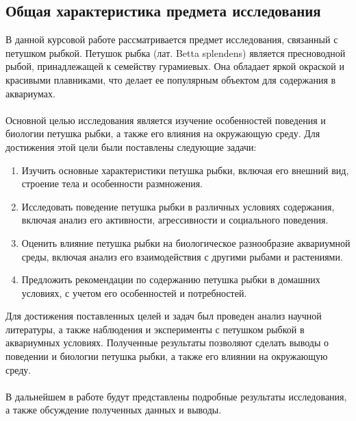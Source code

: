 \documentclass{article}
\begin{document}
\subsection{Общая характеристика предмета исследования}
В данной курсовой работе рассматривается предмет исследования, связанный с петушком рыбкой. Петушок рыбка (лат. Betta splendens) является пресноводной рыбой, принадлежащей к семейству гурамиевых. Она обладает яркой окраской и красивыми плавниками, что делает ее популярным объектом для содержания в аквариумах.\\
~\\
Основной целью исследования является изучение особенностей поведения и биологии петушка рыбки, а также его влияния на окружающую среду. Для достижения этой цели были поставлены следующие задачи:
\begin{enumerate}
\item Изучить основные характеристики петушка рыбки, включая его внешний вид, строение тела и особенности размножения.
\item Исследовать поведение петушка рыбки в различных условиях содержания, включая анализ его активности, агрессивности и социального поведения.
\item Оценить влияние петушка рыбки на биологическое разнообразие аквариумной среды, включая анализ его взаимодействия с другими рыбами и растениями.
\item Предложить рекомендации по содержанию петушка рыбки в домашних условиях, с учетом его особенностей и потребностей.
\end{enumerate}
Для достижения поставленных целей и задач был проведен анализ научной литературы, а также наблюдения и эксперименты с петушком рыбкой в аквариумных условиях. Полученные результаты позволяют сделать выводы о поведении и биологии петушка рыбки, а также его влиянии на окружающую среду.\\
~\\
В дальнейшем в работе будут представлены подробные результаты исследования, а также обсуждение полученных данных и выводы.
\end{document}
